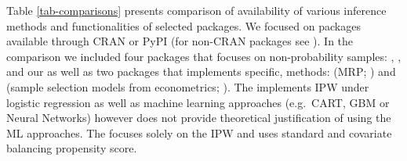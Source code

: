 \documentclass[
]{jss}
\begin{document}
Table \ref{tab-comparisons} presents comparison of availability of
various inference methods and functionalities of selected packages. We
focused on packages available through CRAN or PyPI (for non-CRAN
packages see \citet{cobo2024software}). In the comparison we included
four packages that focuses on non-probability samples: 
\citep{NonProbEst},  \citep{sarig2023balancepythonpackage},
 \citep{castro2024inps} and our  as well as
two packages that implements specific, methods:  (MRP;
\citet{rstanarm}) and  (sample selection models from
econometrics; \citet{GJRM}). The  implements IPW under
logistic regression as well as machine learning approaches (e.g.~CART,
GBM or Neural Networks) however does not provide theoretical
justification of using the ML approaches. The  focuses
solely on the IPW and uses standard and covariate balancing propensity
score.

\begin{table}[ht!]
\centering
{}
\caption{Comparison of inference methods an of different packages}
\label{tab-comparisons}
\end{table}
\end{document}
